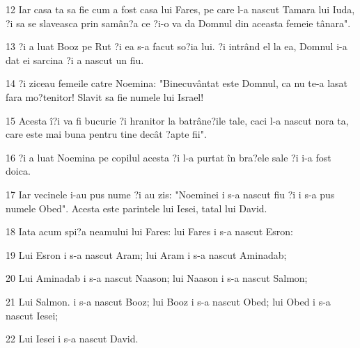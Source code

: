 \par 12 Iar casa ta sa fie cum a fost casa lui Fares, pe care l-a nascut Tamara lui Iuda, ?i sa se slaveasca prin samân?a ce ?i-o va da Domnul din aceasta femeie tânara".
\par 13 ?i a luat Booz pe Rut ?i ea s-a facut so?ia lui. ?i intrând el la ea, Domnul i-a dat ei sarcina ?i a nascut un fiu.
\par 14 ?i ziceau femeile catre Noemina: "Binecuvântat este Domnul, ca nu te-a lasat fara mo?tenitor! Slavit sa fie numele lui Israel!
\par 15 Acesta î?i va fi bucurie ?i hranitor la batrâne?ile tale, caci l-a nascut nora ta, care este mai buna pentru tine decât ?apte fii".
\par 16 ?i a luat Noemina pe copilul acesta ?i l-a purtat în bra?ele sale ?i i-a fost doica.
\par 17 Iar vecinele i-au pus nume ?i au zis: "Noeminei i s-a nascut fiu ?i i s-a pus numele Obed". Acesta este parintele lui Iesei, tatal lui David.
\par 18 Iata acum spi?a neamului lui Fares: lui Fares i s-a nascut Esron:
\par 19 Lui Esron i s-a nascut Aram; lui Aram i s-a nascut Aminadab;
\par 20 Lui Aminadab i s-a nascut Naason; lui Naason i s-a nascut Salmon;
\par 21 Lui Salmon. i s-a nascut Booz; lui Booz i s-a nascut Obed; lui Obed i s-a nascut Iesei;
\par 22 Lui Iesei i s-a nascut David.


